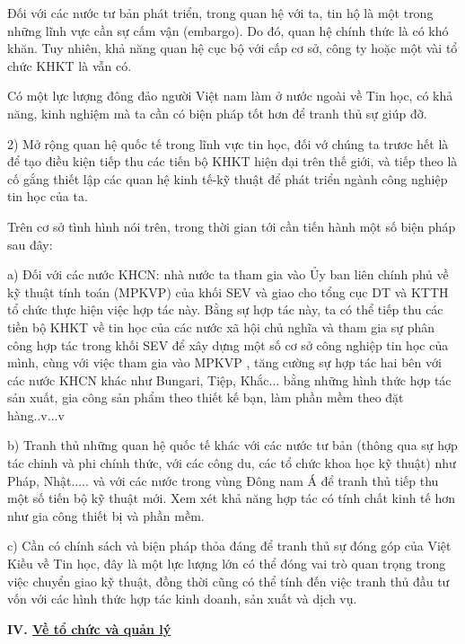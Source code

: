\documentclass[11pt, a4paper, reqno, oneside]{book}
\begin{document}
Đối với các nước tư bản phát triển, trong quan hệ với ta, tin hộ là một trong những lĩnh vực cần sự cấm vận (embargo). Do đó, quan hệ chính thức là có khó khăn. Tuy nhiên, khả năng quan hệ cục bộ với cấp cơ sở, công ty hoặc một vài tổ chức KHKT là vẫn có.


Có một lực lượng đông đảo người Việt nam làm ở nước ngoài về Tin học, có khả năng, kinh nghiệm mà ta cần có biện pháp tốt hơn để tranh thủ sự giúp đỡ.


2)	Mở rộng quan hệ quốc tế trong lĩnh vực tin học, đối vớ chúng ta trươc hết là để tạo điều kiện tiếp thu các tiến bộ KHKT hiện đại trên thế giới, và tiếp theo là cố gắng thiết lập các quan hệ kinh tế-kỹ thuật để phát triển ngành công nghiệp tin học của ta.


Trên cơ sở tình hình nói trên, trong thời gian tới cần tiến hành một số biện pháp sau đây:


a)	Đối với các nước KHCN: nhà nước ta tham gia vào Ủy ban liên chính phủ về kỹ thuật tính toán (MPKVP) của khối SEV và giao cho tổng cục DT và KTTH tổ chức thực hiện việc hợp tác này. Bằng sự hợp tác này, ta có thể tiếp thu các tiền bộ KHKT về tin học của các nước xã hội chủ nghĩa và tham gia sự phân công hợp tác trong khối SEV để xây dựng một số cơ sở công nghiệp tin học của mình, cùng với việc tham gia vào MPKVP , tăng cường sự hợp tác hai bên với các nước KHCN khác như Bungari, Tiệp, Khắc... bằng những hình thức hợp tác sản xuất, gia công sản phẩm theo thiết kế bạn, làm phần mềm theo đặt hàng..v...v


b)	Tranh thủ những quan hệ quốc tế khác với các nước tư bản (thông qua sự hợp tác chinh và phi chính thức, với các công du, các tổ chức khoa học kỹ thuật) như Pháp, Nhật..... và với các nước trong vùng Đông nam Á để tranh thủ tiếp thu một số tiến bộ kỹ thuật mới. Xem xét khả năng hợp tác có tính chất kinh tế hơn như gia công thiết bị và phần mềm.


c)	Cần có chính sách và biện pháp thỏa đáng để tranh thủ sự đóng góp của Việt Kiều về Tin học, đây là một lực lượng lớn có thể đóng vai trò quan trọng trong việc chuyển giao kỹ thuật, đồng thời cũng có thể tính đến việc tranh thủ đầu tư vốn với các hình thức hợp tác kinh doanh, sản xuất và dịch vụ.


\textbf{IV.  \underline{ Về tổ chức và quản lý }}
\end{document}

